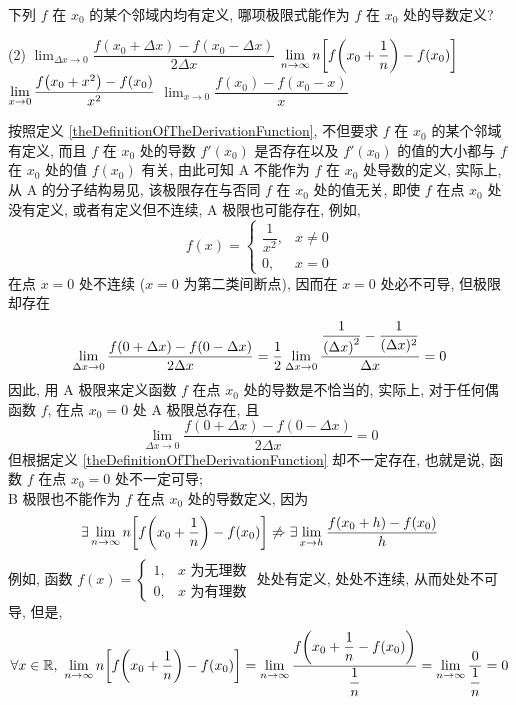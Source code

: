 \begin{example}
    下列 $f$ 在 $x_0$ 的某个邻域内均有定义, 哪项极限式能作为 $f$ 在 $x_0$ 处的导数定义?
    \begin{tasks}(2)
        \task $\displaystyle \lim_{\Delta x\to0}\dfrac{f(x_0+\Delta x)-f(x_0-\Delta x)}{2\Delta x}$
        \task $\displaystyle \lim_{n\to\infty}n\qty[f\qty(x_0+\dfrac{1}{n})-f(x_0)]$
        \task $\displaystyle \lim_{x\to0}\dfrac{f\qty(x_0+x^2)-f(x_0)}{x^2}$
        \task $\displaystyle \lim_{x\to0}\dfrac{f(x_0)-f(x_0-x)}{x}$
    \end{tasks}
\end{example}
\begin{solution}
    按照定义 \ref{theDefinitionOfTheDerivationFunction}, 不但要求 $f$ 在 $x_0$ 的某个邻域有定义, 而且 $f$ 在 $x_0$ 处的导数 $f'(x_0)$ 是否存在以及 $f'(x_0)$ 的值的大小都与 $f$ 在 $x_0$ 处的值 $f(x_0)$ 有关, 由此可知 A 不能作为 $f$ 在 $x_0$ 处导数的定义, 
    实际上, 从 A 的分子结构易见, 该极限存在与否同 $f$ 在 $x_0$ 处的值无关, 即使 $f$ 在点 $x_0$ 处没有定义, 或者有定义但不连续, A 极限也可能存在, 例如, $$f(x)=\begin{cases}
            \dfrac{1}{x^2}, & x\neq0 \\[6pt]
            0,              & x=0
        \end{cases}$$在点 $x=0$ 处不连续 ($x=0$ 为第二类间断点), 因而在 $x=0$ 处必不可导, 但极限却存在 $$\lim_{\Delta x\to0}\dfrac{f(0+\Delta x)-f(0-\Delta x)}{2\Delta x }=\dfrac{1}{2}\lim_{\Delta x\to0}\dfrac{\dfrac{1}{\qty(\Delta x)^2}-\dfrac{1}{(\Delta x)^2}}{\Delta x}=0$$
    因此, 用 A 极限来定义函数 $f$ 在点 $x_0$ 处的导数是不恰当的, 实际上, 对于任何偶函数 $f$, 在点 $x_0=0$ 处 A 极限总存在, 且 $$\lim_{\Delta x\to0}\dfrac{f(0+\Delta x)-f(0-\Delta x)}{2\Delta x}=0$$
    但根据定义 \ref{theDefinitionOfTheDerivationFunction} 却不一定存在, 也就是说, 函数 $f$ 在点 $x_0=0$ 处不一定可导;\\
    B 极限也不能作为 $f$ 在点 $x_0$ 处的导数定义, 因为
    $$\exists\lim_{n\to\infty}n\qty[f\qty(x_0+\dfrac{1}{n})-f(x_0)]\not\Rightarrow \exists\lim_{x\to h}\dfrac{f(x_0+h)-f(x_0)}{h}$$
    例如, 函数 $f(x)=\begin{cases}
            1, & x\text{ 为无理数} \\
            0, & x\text{ 为有理数}
        \end{cases}$ 处处有定义, 处处不连续, 从而处处不可导, 但是, $$\forall x\in\mathbb{R},~\lim_{n\to\infty}n\qty[f\qty(x_0+\dfrac{1}{n})-f(x_0)]=\lim_{n\to\infty}\dfrac{f\qty(x_0+\dfrac{1}{n}-f(x_0))}{\dfrac{1}{n}}=\lim_{n\to\infty}\dfrac{0}{\dfrac{1}{n}}=0$$

\end{solution}
